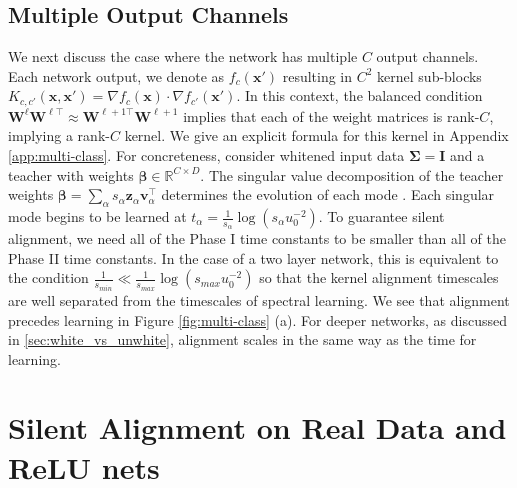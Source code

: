 \documentclass{article} %
\def\x{\bm x}
\begin{document}
\subsection{Multiple Output Channels}

We next discuss the case where the network has multiple $C$ output channels. Each network output, we denote as $f_c(\x')$ resulting in $C^2$ kernel sub-blocks $K_{c,c'}(\x,\x') = \nabla f_c(\x) \cdot \nabla f_{c'}(\x')$. In this context, the balanced condition $\bm W^{\ell} \bm W^{\ell \top} \approx \bm W^{\ell +1 \top} \bm W^{\ell+1}$ implies that each of the weight matrices is rank-$C$, implying a rank-$C$ kernel. We give an explicit formula for this kernel in Appendix \ref{app:multi-class}. For concreteness, consider whitened input data $\bm\Sigma = \bm I$ and a teacher with weights $\bm\beta \in \mathbb{R}^{C \times D}$. The singular value decomposition of the teacher weights $\bm\beta = \sum_{\alpha} s_{\alpha} \bm z_{\alpha} \bm v_{\alpha}^\top$ determines the evolution of each mode \citep{Saxe14exactsolutions}. Each singular mode begins to be learned at $t_{\alpha} = \frac{1}{s_\alpha} \log\left( s_{\alpha} u_0^{-2} \right)$. To guarantee silent alignment, we need all of the Phase I time constants to be smaller than all of the Phase II time constants. In the case of a two layer network, this is equivalent to the condition $\frac{1}{s_{min}} \ll \frac{1}{s_{max}} \log\left( s_{max} u_0^{-2} \right)$ so that the kernel alignment timescales are well separated from the timescales of spectral learning. We see that alignment precedes learning in Figure \ref{fig:multi-class} (a). For deeper networks, as discussed in \ref{sec:white_vs_unwhite}, alignment scales in the same way as the time for learning. 



\section{Silent Alignment on Real Data and ReLU nets}\label{sec:nonlinear_anisotropy}
\end{document}
